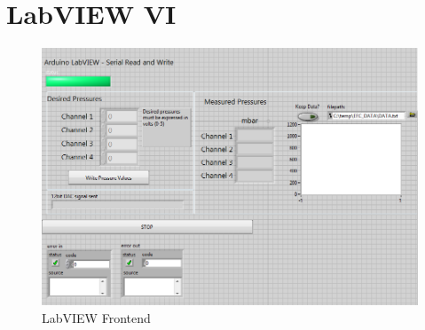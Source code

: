 \chapter{LabVIEW VI}

\begin{figure}[h]
\centering 
\includegraphics[width=01.0\columnwidth]{frontend.PNG} 
\caption[LabVIEW Frontend]{LabVIEW Frontend} 
\label{fig:frontend} 
\end{figure}

